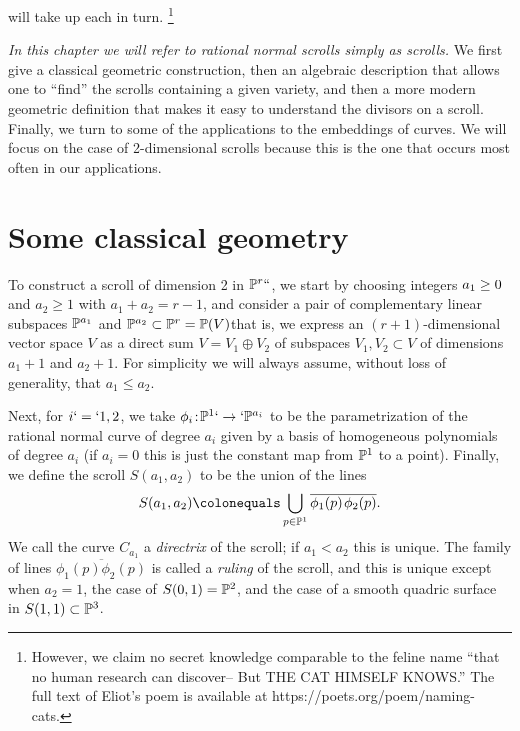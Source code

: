 %
will take up each in turn.%
\footnote{However, we claim no secret knowledge comparable to the
feline name ``that no human research can discover-- But THE CAT
HIMSELF KNOWS.'' The full text of Eliot's poem is available at
https://poets.org/\allowbreak poem/naming-cats.%
}%

{\it In this chapter 
we will refer to rational normal scrolls simply as scrolls.}
We first give
a classical geometric construction, then an algebraic description that
allows one to ``find'' the scrolls containing a given variety, and
then a more modern geometric definition that makes it easy to
understand the divisors on a scroll. Finally, we turn to some of the
applications to the embeddings of curves. We will focus on the case of
2-dimensional scrolls because this is the 
one
that occurs most often in our applications.

\section{Some classical geometry}\label{daily name}

To construct a scroll of dimension 2 in ${\mathbb P}^r` `$, we start by choosing
integers 
$a_1\ge\nobreak0$
and  
$a_2\ge1$
with $a_1 + a_2 = r-1$, and
consider  a pair of complementary linear subspaces ${\mathbb P}^{a_1}$ and
${\mathbb P}^{a_2} \subset {\mathbb P}^r = {\mathbb P}(V)$\emdash that is, we express an
$(r+1)$-dimensional vector space $V$ as a direct sum $V =  V_1 \oplus
V_2$ of subspaces $V_1, V_2 \subset V$ of dimensions $a_1+1$ and
$a_2+1$. For simplicity we will always assume, without loss of 
generality, that $a_{1}\leq a_{2}$.

Next, for $i`=`1,2$, we take $\phi_i \!:\!  %
\PP^1 `\to` \PP^{a_i}$ to be the
parametrization of the rational normal curve of degree $a_i$ given by
a basis of homogeneous polynom\-ials of degree $a_i$ (if $a_i = 0$ this
is just the constant map from ${\mathbb P}^1$ to a point). Finally, we define
the scroll $S(a_1, a_2)$ to be the union of the lines
$$
S(a_1,a_2)\colonequals\bigcup_{p\in \PP^1} \overline{\phi_1(p)\, \phi_2(p)}.
\vspace*{-2pt}
$$
We call the curve $C_{a_{1}}$ a \emph{directrix} of the scroll; if $a_{1}<a_{2}$ this
is unique. 
%
The family of lines
$ \overline{\phi_1(p) \phi_2(p)}$ is called a 
%
\emph{ruling} of the scroll, and this is unique except when $a_{2} = 1$,
the case of $S(0,1) = {\mathbb P}^{2}$, 
and the case of a smooth quadric surface in $ S(1,1)\subset {\mathbb P}^{3}$.

